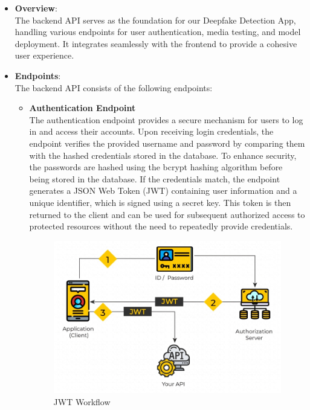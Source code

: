 \begin{itemize}
      \item \textbf{Overview}:\\
            The backend API serves as the foundation for our Deepfake Detection App, handling various endpoints for user authentication, media testing, and model deployment. It integrates seamlessly with the frontend to provide a cohesive user experience.

      \item \textbf{Endpoints}:\\
            The backend API consists of the following endpoints:

            \begin{itemize}

                  \item \textbf{Authentication Endpoint}\\
                        The authentication endpoint provides a secure mechanism for users to log in and access their accounts. Upon receiving login credentials, the endpoint verifies the provided username and password by comparing them with the hashed credentials stored in the database. To enhance security, the passwords are hashed using the bcrypt hashing algorithm before being stored in the database. If the credentials match, the endpoint generates a JSON Web Token (JWT) containing user information and a unique identifier, which is signed using a secret key. This token is then returned to the client and can be used for subsequent authorized access to protected resources without the need to repeatedly provide credentials.

                        \begin{figure}[htbp]
                              \centering
                              \includegraphics[width=5in]{img/JSON-Web-Tokens-01.png}
                              \caption{JWT Workflow}
                        \end{figure}


\end{itemize}
\end{itemize}
